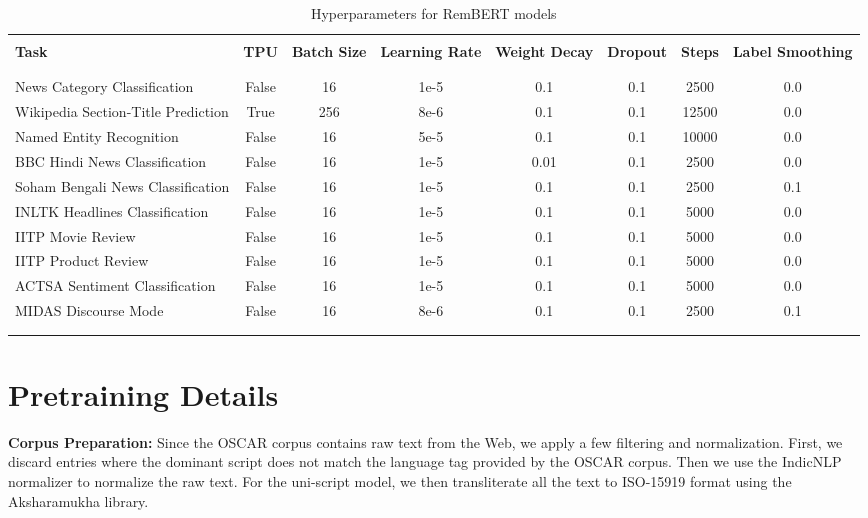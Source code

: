 \documentclass[11pt]{article}
\begin{document}
\begin{table*}[hbt!]
\begin{center}
\begin{adjustbox}{max width=\textwidth}
\small
\begin{tabular}{l c c c c c c c}
\\ \hline \\
\textbf{Task} & \textbf{TPU} & \textbf{Batch Size} & \textbf{Learning Rate} & \textbf{Weight Decay} & \textbf{Dropout} & \textbf{Steps} & \textbf{Label Smoothing} \\
\\ \hline \\
News Category Classification  & False & 16 & 1e-5 & 0.1 & 0.1 & 2500 & 0.0 \\
Wikipedia Section-Title Prediction & True & 256 & 8e-6 & 0.1 & 0.1 & 12500 & 0.0 \\
Named Entity Recognition & False & 16 & 5e-5 & 0.1 & 0.1 & 10000 & 0.0 \\
BBC Hindi News Classification & False & 16 & 1e-5 & 0.01 & 0.1 & 2500 & 0.0 \\
Soham Bengali News Classification & False & 16 & 1e-5 & 0.1 & 0.1 & 2500 & 0.1 \\
INLTK Headlines Classification & False & 16 & 1e-5 & 0.1 & 0.1 & 5000 & 0.0 \\
IITP Movie Review & False & 16 & 1e-5 & 0.1 & 0.1 & 5000 & 0.0 \\
IITP Product Review & False & 16 & 1e-5 & 0.1 & 0.1 & 5000 & 0.0 \\
ACTSA Sentiment Classification & False & 16 & 1e-5 & 0.1 & 0.1 & 5000 & 0.0 \\
MIDAS Discourse Mode & False & 16 & 8e-6 & 0.1 & 0.1 & 2500 & 0.1 \\
\\ \hline \\
\end{tabular}
\end{adjustbox}
\end{center}
\caption{Hyperparameters for RemBERT models}
\label{downstream-hyperparameters-tb-rembert}
\end{table*}

\section{Pretraining Details}
\label{sec:pretraining}
\textbf{Corpus Preparation:}
Since the OSCAR corpus contains raw text from the Web, we apply a few filtering and normalization. First, we discard entries where the dominant script does not match the language tag provided by the OSCAR corpus. Then we use the IndicNLP normalizer \citep{kunchukuttan2020indicnlp} to normalize the raw text. For the uni-script model, we then transliterate all the text to ISO-15919 format using the Aksharamukha \citep{Aksharamukha} library.
\end{document}
